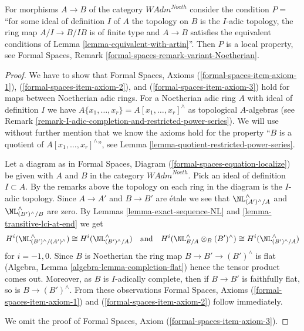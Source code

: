 \begin{lemma}
\label{lemma-rig-etale-axioms}
For morphisms $A \to B$ of the category $\textit{WAdm}^{Noeth}$
consider the condition $P=$``for some ideal of definition $I$ of $A$
the topology on $B$ is the $I$-adic topology, the ring map $A/I \to B/IB$
is of finite type and $A \to B$ satisfies the equivalent conditions of
Lemma \ref{lemma-equivalent-with-artin}''. Then $P$ is a local property, see
Formal Spaces, Remark \ref{formal-spaces-remark-variant-Noetherian}.
\end{lemma}

\begin{proof}
We have to show that Formal Spaces, Axioms (\ref{formal-spaces-item-axiom-1}),
(\ref{formal-spaces-item-axiom-2}), and (\ref{formal-spaces-item-axiom-3})
hold for maps between Noetherian adic rings. For a Noetherian adic ring
$A$ with ideal of definition $I$ we have
$A\{x_1, \ldots, x_r\} = A[x_1, \ldots, x_r]^\wedge$ as topological
$A$-algebras (see
Remark \ref{remark-I-adic-completion-and-restricted-power-series}).
We will use without further mention that we know the axioms hold
for the property ``$B$ is a quotient of $A[x_1, \ldots, x_r]^\wedge$'', see
Lemma \ref{lemma-quotient-restricted-power-series}.

\medskip\noindent
Let a diagram as in
Formal Spaces, Diagram (\ref{formal-spaces-equation-localize})
be given with $A$ and $B$ in the category $\textit{WAdm}^{Noeth}$.
Pick an ideal of definition $I \subset A$. By the remarks above
the topology on each ring in the diagram is the $I$-adic topology.
Since $A \to A'$ and $B \to B'$ are \'etale we see that
$\NL^\wedge_{(A')^\wedge/A}$ and $\NL^\wedge_{(B')^\wedge/B}$
are zero. By Lemmas \ref{lemma-exact-sequence-NL} and
\ref{lemma-transitive-lci-at-end} we get
$$
H^i(\NL^\wedge_{(B')^\wedge/(A')^\wedge})
\cong
H^i(\NL^\wedge_{(B')^\wedge/A})
\quad\text{and}\quad
H^i(\NL^\wedge_{B/A} \otimes_B (B')^\wedge) \cong
H^i(\NL^\wedge_{(B')^\wedge/A})
$$
for $i = -1, 0$. Since $B$ is Noetherian the ring map
$B \to B' \to (B')^\wedge$ is flat
(Algebra, Lemma \ref{algebra-lemma-completion-flat})
hence the tensor product comes out. Moreover, as $B$ is
$I$-adically complete, then if $B \to B'$ is faithfully flat,
so is $B \to (B')^\wedge$. From these observations
Formal Spaces, Axioms (\ref{formal-spaces-item-axiom-1})
and (\ref{formal-spaces-item-axiom-2}) follow immediately.

\medskip\noindent
We omit the proof of Formal Spaces, Axiom (\ref{formal-spaces-item-axiom-3}).
\end{proof}

